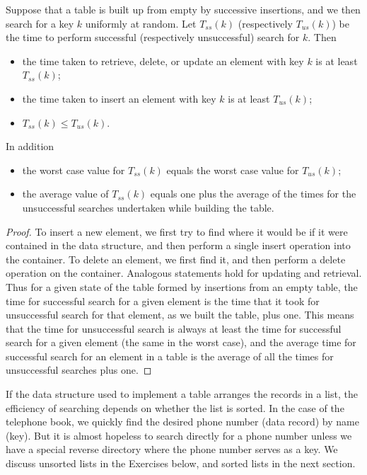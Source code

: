 \begin{Lemma}\label{lem:ss-us}
Suppose that a table is built up from empty by successive insertions, and we 
then search for a key $k$ uniformly at random. 
Let $T_{ss}(k)$ (respectively $T_{us}(k)$) be the time to 
perform successful (respectively unsuccessful) search for $k$. Then
\begin{itemize}
\item the time taken to retrieve, delete, or update an element with key $k$ is at least 
$T_{ss}(k)$; 
\item the time taken to insert an element with key $k$ is at least $T_{us}(k)$;
\item $T_{ss}(k) \leq T_{us}(k)$.
\end{itemize}

In addition
\begin{itemize}
\item
the worst case value for $T_{ss}(k)$ equals the worst case value for $T_{us}(k)$;
\item the average value of $T_{ss}(k)$ equals one plus the average of the 
times for the unsuccessful searches undertaken while building the table.
\end{itemize}
\end{Lemma}
\begin{proof}
To insert a new element, we first try to find where it would be if it were contained 
in the data structure, and then perform a single insert operation into the container. 
To delete an element, we first find it, and then perform a delete operation on the 
container. Analogous statements hold for updating and retrieval.
Thus for a given state of the table formed by insertions from an empty table, 
the time for successful search for a given element is the time that it took for 
unsuccessful search for that element, as we built the table, plus one. This means that 
the time for unsuccessful search is always at least the time for successful search 
for a given element (the same in the worst case), and the average time for 
successful search for an element in a table is the average of all the times for 
unsuccessful searches plus one. 
\end{proof}

If the data structure used to implement a table arranges the records in a list, 
the efficiency of searching depends on whether the list is sorted. In the case 
of the telephone book, we quickly find  the desired phone number (data record) 
by name (key). But it is almost hopeless to search directly for a phone number 
unless we have a special reverse directory where the phone number serves as a 
key. We discuss unsorted lists in the Exercises below, and sorted lists in the 
next section.


